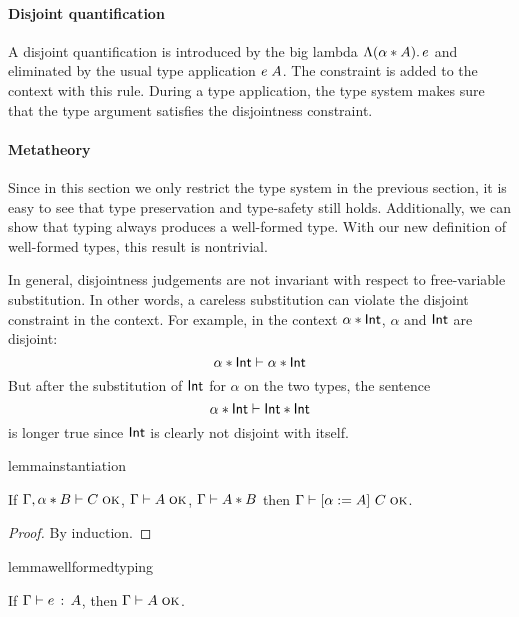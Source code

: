 \paragraph{Disjoint quantification} A disjoint quantification is introduced by
the big lambda $\Lambda (\alpha * A).\, e$ and eliminated by the usual type
application $e \; A$. The constraint is added to the context with this rule.
During a type application, the type system makes sure that the type argument
satisfies the disjointness constraint.

\paragraph{Metatheory} Since in this section we only restrict the type
system in the
previous section, it is easy to see that type preservation and type-safety still
holds. Additionally, we can show that typing always produces a well-formed type.
With our new definition of well-formed types, this result is nontrivial.

In general, disjointness judgements are not invariant with respect to
free-variable substitution. In other words, a careless substitution can violate
the disjoint constraint in the context. For example, in the context $\alpha
* \textsf{Int}$, $\alpha$ and $\textsf{Int}$ are disjoint:
\[ \alpha * \textsf{Int} \vdash \alpha * \textsf{Int} \]
But after the substitution of $\textsf{Int}$ for $\alpha$ on the two types, the sentence
\[ \alpha * \textsf{Int} \vdash \textsf{Int} * \textsf{Int} \]
is longer true since $\textsf{Int}$ is clearly not disjoint with itself.

\begin{restatable}[Instantiation]{lemma}{instantiation}
  \label{lemma:instantiation}

  If $\Gamma, \alpha * B \vdash C \; \textsc{ok}$, $\Gamma \vdash A \; \textsc{ok}$, $\Gamma \vdash A * B$
  then $\Gamma \vdash \lbrack \alpha := A \rbrack~ C \; \textsc{ok}$.
\end{restatable}

\begin{proof}
  By induction.
\end{proof}

\begin{restatable}{lemma}{wellformedtyping}
  \label{lemma:wellformed-typing}

  If $\Gamma \vdash e \ \!:\! \ A$, then $\Gamma \vdash A \; \textsc{ok}$.
\end{restatable}

